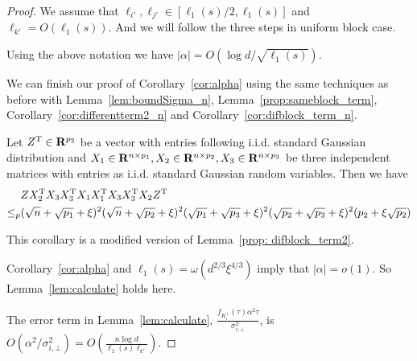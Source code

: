 \begin{proof}
We assume that $\ell_{i'},\ell_{j'} \in [\ell_{1}(s)/2, \ell_{1}(s)]$ and $\ell_{k'} = O(\ell_{1}(s))$. And we will follow the three steps in uniform block case.

\begin{corollary}\label{cor:alpha}
Using the above notation we have $|\alpha| = O\left(\log d/\sqrt{\ell_1(s)} \right)$.
\end{corollary}
We can finish our proof of Corollary~\ref{cor:alpha} using the same techniques as before with Lemma~\ref{lem:boundSigma_n}, Lemma~\ref{prop:sameblock_term}, Corollary~\ref{cor:differentterm2_n} and Corollary~\ref{cor:difblock_term_n}.

\begin{corollary}\label{cor:differentterm2_n}
Let $Z^{\mathrm{T}} \in \mathbf{R}^{p_2}$ be a vector with entries following i.i.d. standard Gaussian distribution and $X_1 \in \mathbf{R}^{n\times p_1}, X_2 \in \mathbf{R}^{n\times p_2}, X_3 \in \mathbf{R}^{n\times p_3}$ be three independent matrices with entries as i.i.d. standard Gaussian random variables. Then we have
\begin{equation}
\begin{split}
    &Z X_2^{\mathrm{T}}X_3X_3^{\mathrm{T}}X_1X_1^{\mathrm{T}}X_3X_3^{\mathrm{T}}X_2 Z^{\mathrm{T}}  \\ 
    \leq_p& (\sqrt{n} + \sqrt{p_1} + \xi)^{2}(\sqrt{n} + \sqrt{p_2} + \xi)^{2}(\sqrt{p_1}  +\sqrt{p_3} +  \xi)^{2}(\sqrt{p_2}  +\sqrt{p_3}+ \xi)^{2}(p_2+\xi\sqrt{p_2})
\end{split}
\end{equation}
\end{corollary}
This corollary is a modified version of  Lemma~\ref{prop: difblock_term2}.

Corollary~\ref{cor:alpha} and $\ell_1(s) = \omega(d^{2/3}\xi^{4/3})$ imply that $|\alpha| = o(1)$. So Lemma~\ref{lem:calculate} holds here.

The error term in Lemma~\ref{lem:calculate}, $\frac{f_{K^{\bot}_i}(\tau )\alpha^2 \tau}{\sigma^2_{i,\bot}}$, is $ O(\alpha^2/\sigma^2_{i,\bot}) = O\left(\frac{n\log d}{\ell_1(s)\ell_{k'}} \right)$. 
\end{proof}






